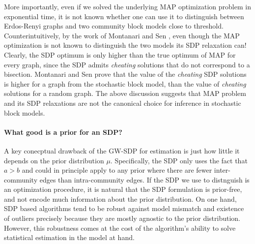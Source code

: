 %
%
%
%
%
%
More importantly, even if we solved the underlying MAP optimization problem in exponential time, it is not known whether one can use it to distinguish between Erdos-Renyi graphs and two community block models close to threshold.
%
Counterintuitively, by the work of Montanari and Sen \cite{montanari2015semidefinite}, even though the MAP optimization is not known to distinguish the two models its SDP relaxation can!
%
Clearly, the SDP optimum is only higher than the true optimum of MAP for every graph, since the SDP admits {\it cheating} solutions that do not correspond to a bisection.
%
Montanari and Sen prove that the value of the {\it cheating} SDP solutions is higher for a graph from the stochastic block model, than the value of {\it cheating} solutions for a random graph.  
%
The above discussion suggests that MAP problem and its SDP relaxations are not the canonical choice for inference in stochastic block models.


\paragraph{What good is a prior for an SDP?}
%
A key conecptual drawback of the GW-SDP for estimation is just how little it depends on the prior distribution $\mu$.
%
Specifically, the SDP only uses the fact that $a > b$ and could in principle apply to any prior where there are fewer inter-community edges than intra-community edges.
%
If the SDP we use to distnguish is an optimization procedure, it is natural that the SDP formulation is prior-free, and not encode much information about the prior distribution.
%
On one hand, SDP based algorithms tend to be robust against model mismatch and existence of outliers precisely because they are mostly agnostic to the prior distribution.
%
However, this robustness comes at the cost of the algorithm's ability to solve statistical estimation in the model at hand.  
%

